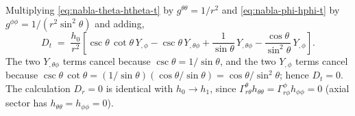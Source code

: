 Multiplying \eqref{eq:nabla-theta-htheta-t} by
$g^{\theta\theta}=1/r^{2}$ and \eqref{eq:nabla-phi-hphi-t} by
$g^{\phi\phi}=1/(r^{2}\sin^{2}\theta)$ and adding,
\begin{equation}
  D_{t}
  \;=\; \frac{h_{0}}{r^{2}}\!
        \left[
          \csc\theta\,\cot\theta\,Y_{,\phi}
          - \csc\theta\,Y_{,\theta\phi}
          + \frac{1}{\sin\theta}\,Y_{,\theta\phi}
          - \frac{\cos\theta}{\sin^{2}\theta}\,Y_{,\phi}
        \right].
  \label{eq:Dt-assembled}
\end{equation}
The two $Y_{,\theta\phi}$ terms cancel because
$\csc\theta = 1/\sin\theta$, and the two $Y_{,\phi}$ terms cancel
because
$\csc\theta\,\cot\theta = (1/\sin\theta)(\cos\theta/\sin\theta)
= \cos\theta/\sin^{2}\theta$; hence $D_{t}=0$.
The calculation $D_{r}=0$ is identical with $h_{0}\to h_{1}$,
since $\Gamma^{\theta}_{r\theta}h_{\theta\theta}
= \Gamma^{\phi}_{r\phi}h_{\phi\phi} = 0$ (axial sector has
$h_{\theta\theta}=h_{\phi\phi}=0$).

